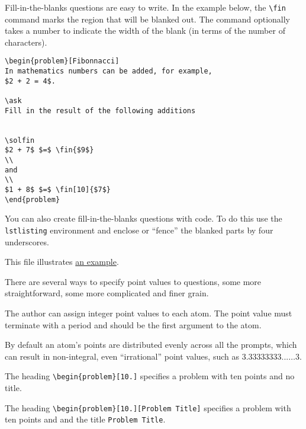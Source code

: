 \begin{example}

Fill-in-the-blanks questions are easy to write. In the example below, the \lstinline`\fin` command marks the region that will be blanked out.  The command optionally takes a number to indicate the width of the blank (in terms of the number of characters).


\begin{lstlisting}
\begin{problem}[Fibonnacci]
In mathematics numbers can be added, for example,
$2 + 2 = 4$. 

\ask
Fill in the result of the following additions


\solfin
$2 + 7$ $=$ \fin{$9$}
\\
and
\\ 
$1 + 8$ $=$ \fin[10]{$7$}
\end{problem}
\end{lstlisting}
\end{example}



\begin{example}
You can also create fill-in-the-blanks questions with code.  To do this use the \lstinline`lstlisting` environment and enclose or ``fence'' the blanked parts by four underscores.
%

This file illustrates 
\href{https://github.com/diderot-edu/diderot-guide/blob/master/booklet/quiz/bingled.tex}
{an example}.
\end{example}


\begin{gram}
There are several ways to specify point values to questions, some more
straightforward, some more complicated and finer grain.

The author can assign integer point values to each atom. 
%
The point value must terminate with a period and should be the first argument to the atom.
%

By default an atom's points are distributed evenly across all the
prompts, which can result in non-integral, even ``irrational'' point
values, such as $3.33333333...\ldots 3$.  
%
\end{gram}

\begin{example}
The heading
%
 \lstinline`\begin{problem}[10.]` specifies a problem with ten points
   and no title.

The heading
%
\lstinline`\begin{problem}[10.][Problem Title]` 
%
specifies a  problem with ten points and and the title
\lstinline`Problem Title`.
%
\end{example}

